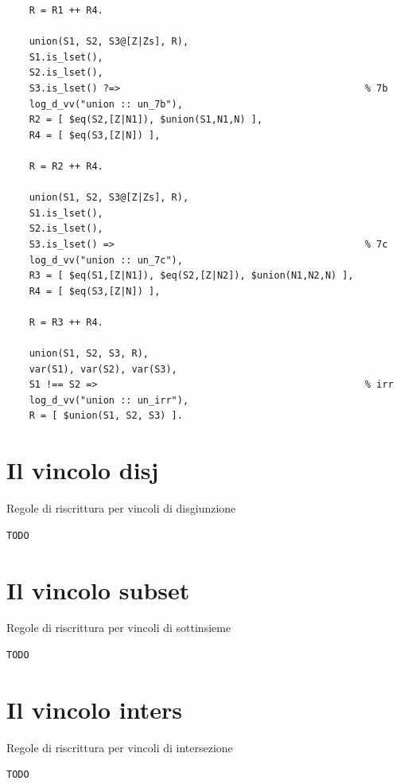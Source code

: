 \documentclass[12pt,a4paper,openright]{book} %
\begin{document}
\begin{verbatim}
	R = R1 ++ R4.
	
	union(S1, S2, S3@[Z|Zs], R),
	S1.is_lset(),
	S2.is_lset(),
	S3.is_lset() ?=>                                           % 7b
	log_d_vv("union :: un_7b"),
	R2 = [ $eq(S2,[Z|N1]), $union(S1,N1,N) ],
	R4 = [ $eq(S3,[Z|N]) ],
	
	R = R2 ++ R4.
	
	union(S1, S2, S3@[Z|Zs], R),
	S1.is_lset(),
	S2.is_lset(),
	S3.is_lset() =>                                            % 7c
	log_d_vv("union :: un_7c"),
	R3 = [ $eq(S1,[Z|N1]), $eq(S2,[Z|N2]), $union(N1,N2,N) ],
	R4 = [ $eq(S3,[Z|N]) ],
	
	R = R3 ++ R4.
	
	union(S1, S2, S3, R),
	var(S1), var(S2), var(S3),
	S1 !== S2 =>                                               % irr
	log_d_vv("union :: un_irr"),
	R = [ $union(S1, S2, S3) ].
	\end{verbatim}
	

\section{Il vincolo disj}

\begin{algorithm}[H]
	\caption{Regole di riscrittura per vincoli di disgiunzione}
	\label{alg:disj_constraints}
\end{algorithm}
\begin{verbatim}
TODO
\end{verbatim}


\section{Il vincolo subset}

\begin{algorithm}[H]
	\caption{Regole di riscrittura per vincoli di sottinsieme}
	\label{alg:subset_constraints}
\end{algorithm}
\begin{verbatim}
TODO
\end{verbatim}
	

\section{Il vincolo inters}

\begin{algorithm}[H]
	\caption{Regole di riscrittura per vincoli di intersezione}
	\label{alg:inters_constraints}
\end{algorithm}
\begin{verbatim}
TODO
\end{verbatim}
	
\end{document}
